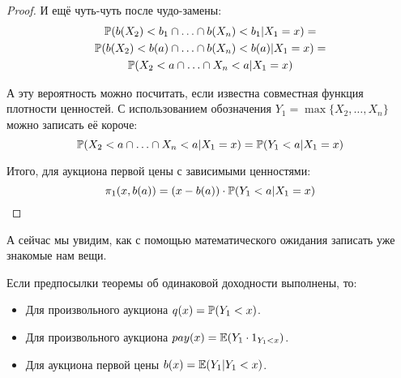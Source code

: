 \begin{proof}
И ещё чуть-чуть после чудо-замены:
\begin{multline}
\P(b(X_{2})<b_{1}\cap \ldots \cap b(X_{n})<b_{1}|X_{1}=x)=\\
\P(b(X_{2})<b(a)\cap \ldots \cap b(X_{n})<b(a)|X_{1}=x)=\\
\P(X_{2}<a\cap \ldots \cap X_{n}<a|X_{1}=x)
\end{multline}

А эту вероятность можно посчитать, если известна совместная функция плотности ценностей. С использованием обозначения $ Y_{1}=\max\{X_{2},\ldots, X_{n}\} $ можно записать её короче:
\begin{equation}
\P(X_{2}<a\cap \ldots \cap X_{n}<a|X_{1}=x)=\P(Y_{1}<a|X_{1}=x)
\end{equation}

Итого, для аукциона первой цены с зависимыми ценностями:
\begin{equation}
\pi_{1}(x,b(a))=(x-b(a))\cdot \P(Y_{1}<a|X_{1}=x)
\end{equation}
\end{proof}

А сейчас мы увидим, как с помощью математического ожидания записать уже знакомые нам вещи.

\begin{myth} Если предпосылки теоремы об одинаковой доходности выполнены, то:
\label{probabilistic_interpretation}
\begin{itemize}
\item Для произвольного аукциона $ q(x)=\P(Y_{1}<x) $.
\item Для произвольного аукциона $ pay(x)=\E(Y_{1}\cdot 1_{Y_{1}<x}) $.
\item Для аукциона первой цены $ b(x)=\E(Y_{1}|Y_{1}<x) $.
\end{itemize}
\end{myth}

